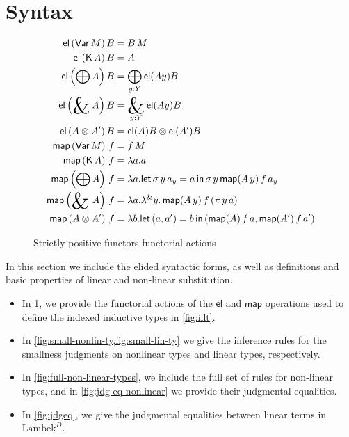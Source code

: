 \documentclass[acmsmall,nonacm]{acmart}
\newcommand{\Var}{\mathsf{Var}}
\newcommand{\K}{\mathsf{K}}
\newcommand{\map}{\mathsf{map}}
\newcommand{\theoryabbv}{$\textrm{Lambek}^D$\xspace}
\DeclareMathOperator*{\bigamp}{\scalerel*{\&}{\bigoplus}}
\DeclareMathOperator*{\bigwith}{\scalerel*{\&}{\bigoplus}}
\newcommand{\oplusinj}[2]{\sigma\,#1\,#2}
\newcommand{\withprj}[2]{\pi\,#1\,#2}
\newcommand{\el}{\mathsf{el}}
\newcommand{\letin}[3]{\mathsf{let}\, #1 = #2 \, \mathsf{in}\, #3}
\newcommand{\withlamb}[2]{{\lambda}^{{\&}} #1.\, #2}
\begin{document}


\newpage
\ifarxiv
\appendix
\section{Syntax}
\label{sec:syntax}

\begin{figure}
  \begin{align*}
    \el\left(\Var\,M\right) B &= B\,M\\
    \el\left(\mathsf{K}\,A\right) B &= A\\
    \el\left(\bigoplus A\right) B &= \bigoplus_{y:Y}\el(A y)B\\
    \el\left(\bigamp A\right) B &= \bigamp_{y:Y}\el(A y)B\\
    \el\left(A \otimes A'\right) B &= \el(A)B \otimes \el(A')B \\
    \map\left(\Var\,M\right)\,f &= f\,M\\
    \map\left(\K\,A\right)\,f &= \lambda a. a\\
    \map\left(\bigoplus A\right)\,f &= \lambda a. \letin{\oplusinj y {a_y}}{a}{\oplusinj y {\map(A\,y)\,f\,a_y}}\\
    \map\left(\bigwith\,A\right)\,f &= \lambda a. \withlamb{y}{\map(A\,y)\,f\,(\withprj y a)}\\
    \map\left(A \otimes A'\right)\,f &= \lambda b. \letin{(a,a')}{b}{(\map(A)\,f\,a,\map(A')\,f\,a')}
  \end{align*}
  \caption{Strictly positive functors functorial actions}
  \label{fig:spf-act}
\end{figure}

In this section we include the elided syntactic forms, as well as
definitions and basic properties of linear and non-linear
substitution.

\begin{itemize}
\item In \cref{fig:spf-act}, we provide the functorial actions of the $\el$
  and $\map$ operations used to define the indexed inductive types in
  \cref{fig:iilt}.
\item In \cref{fig:small-nonlin-ty,fig:small-lin-ty} we give the inference rules
  for the smallness judgments on nonlinear types and linear types, respectively.
\item In \cref{fig:full-non-linear-types}, we include the full set of rules for
  non-linear types, and in \cref{fig:jdg-eq-nonlinear} we provide their
  judgmental equalities.
\item In \cref{fig:jdgeq}, we give the judgmental equalities between
  linear terms in \theoryabbv.
\end{itemize}
\end{document}
